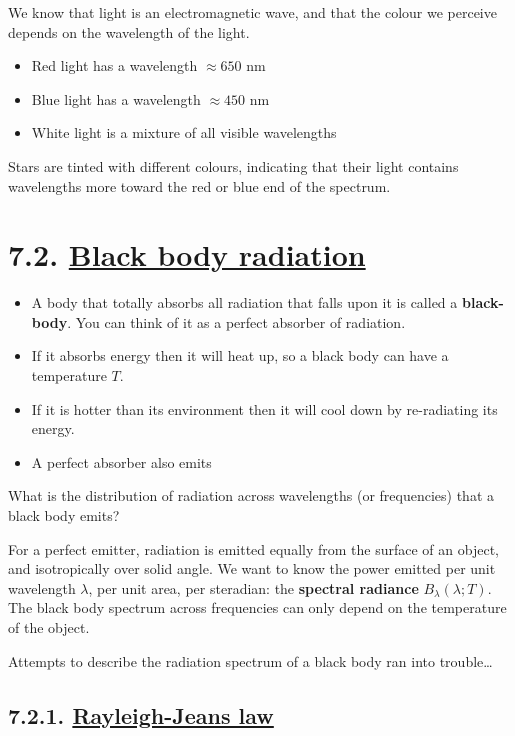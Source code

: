 \documentclass[
  letterpaper,
  DIV=11,
  numbers=noendperiod]{scrreprt}
\providecommand{\tightlist}{%
  \setlength{\itemsep}{0pt}\setlength{\parskip}{0pt}}\usepackage{longtable,booktabs,array}
\begin{document}
We know that light is an electromagnetic wave, and that the colour we
perceive depends on the wavelength of the light.

\begin{itemize}
\tightlist
\item
  Red light has a wavelength \(\approx 650\) nm
\item
  Blue light has a wavelength \(\approx 450\) nm
\item
  White light is a mixture of all visible wavelengths
\end{itemize}

Stars are tinted with different colours, indicating that their light
contains wavelengths more toward the red or blue end of the spectrum.

\hypertarget{black-body-radiation}{%
\section{\texorpdfstring{7.2. \protect\hyperlink{toc0_}{Black body
radiation}}{7.2. Black body radiation}}\label{black-body-radiation}}

\begin{itemize}
\tightlist
\item
  A body that totally absorbs all radiation that falls upon it is called
  a \textbf{black-body}. You can think of it as a perfect absorber of
  radiation.
\item
  If it absorbs energy then it will heat up, so a black body can have a
  temperature \(T\).
\item
  If it is hotter than its environment then it will cool down by
  re-radiating its energy.
\item
  A perfect absorber also emits
\end{itemize}

What is the distribution of radiation across wavelengths (or
frequencies) that a black body emits?

For a perfect emitter, radiation is emitted equally from the surface of
an object, and isotropically over solid angle. We want to know the power
emitted per unit wavelength \(\lambda\), per unit area, per steradian:
the \textbf{spectral radiance} \(B_\lambda(\lambda;T)\). The black body
spectrum across frequencies can only depend on the temperature of the
object.

Attempts to describe the radiation spectrum of a black body ran into
trouble\ldots{}

\hypertarget{rayleigh-jeans-law}{%
\subsection{\texorpdfstring{7.2.1.
\protect\hyperlink{toc0_}{Rayleigh-Jeans
law}}{7.2.1. Rayleigh-Jeans law}}\label{rayleigh-jeans-law}}
\end{document}
